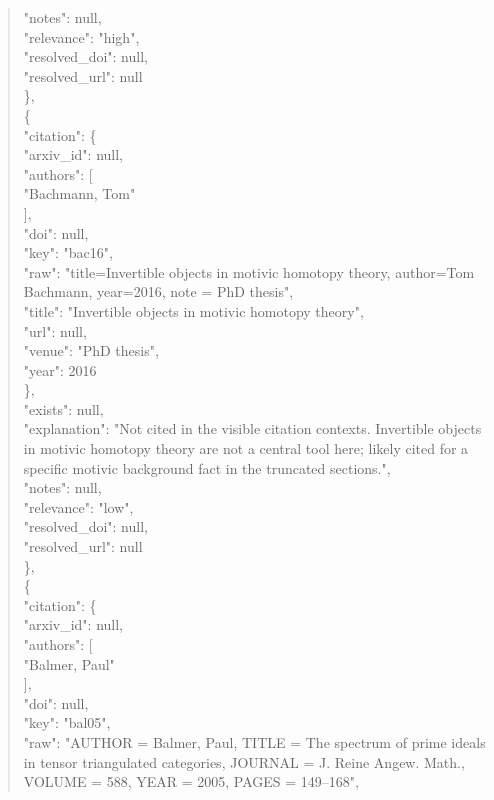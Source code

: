 \documentclass[11pt]{article}
\begin{document}
\begin{quote}
      "notes": null,\\
      "relevance": "high",\\
      "resolved\_doi": null,\\
      "resolved\_url": null\\
    \},\\
    \{\\
      "citation": \{\\
        "arxiv\_id": null,\\
        "authors": [\\
          "Bachmann, Tom"\\
        ],\\
        "doi": null,\\
        "key": "bac16",\\
        "raw": "title=Invertible objects in motivic homotopy theory, author=Tom Bachmann, year=2016, note = PhD thesis",\\
        "title": "Invertible objects in motivic homotopy theory",\\
        "url": null,\\
        "venue": "PhD thesis",\\
        "year": 2016\\
      \},\\
      "exists": null,\\
      "explanation": "Not cited in the visible citation contexts. Invertible objects in motivic homotopy theory are not a central tool here; likely cited for a specific motivic background fact in the truncated sections.",\\
      "notes": null,\\
      "relevance": "low",\\
      "resolved\_doi": null,\\
      "resolved\_url": null\\
    \},\\
    \{\\
      "citation": \{\\
        "arxiv\_id": null,\\
        "authors": [\\
          "Balmer, Paul"\\
        ],\\
        "doi": null,\\
        "key": "bal05",\\
        "raw": "AUTHOR = Balmer, Paul, TITLE = The spectrum of prime ideals in tensor triangulated categories, JOURNAL = J. Reine Angew. Math., VOLUME = 588, YEAR = 2005, PAGES = 149--168",\\

\end{quote}
\end{document}
